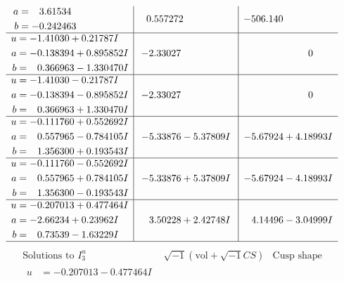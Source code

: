 \documentclass[1p]{elsarticle_modified}
\theoremstyle{definition}
\newcommand{\I}{\sqrt{-1}}
\begin{document}
$$\begin{array}{c|c|c}
\begin{aligned}
a &= \phantom{-}3.61534\phantom{ +0.000000I} \\
b &= -0.242463\phantom{ +0.000000I}\end{aligned}
 & \phantom{-}0.557272\phantom{ +0.000000I} & -506.140\phantom{ +0.000000I} \\ \hline\begin{aligned}
u &= -1.41030 + 0.21787 I \\
a &= -0.138394 + 0.895852 I \\
b &= \phantom{-}0.366963 - 1.330470 I\end{aligned}
 & -2.33027\phantom{ +0.000000I} & \phantom{-0.000000 } 0 \\ \hline\begin{aligned}
u &= -1.41030 - 0.21787 I \\
a &= -0.138394 - 0.895852 I \\
b &= \phantom{-}0.366963 + 1.330470 I\end{aligned}
 & -2.33027\phantom{ +0.000000I} & \phantom{-0.000000 } 0 \\ \hline\begin{aligned}
u &= -0.111760 + 0.552692 I \\
a &= \phantom{-}0.557965 - 0.784105 I \\
b &= \phantom{-}1.356300 + 0.193543 I\end{aligned}
 & -5.33876 - 5.37809 I & -5.67924 + 4.18993 I \\ \hline\begin{aligned}
u &= -0.111760 - 0.552692 I \\
a &= \phantom{-}0.557965 + 0.784105 I \\
b &= \phantom{-}1.356300 - 0.193543 I\end{aligned}
 & -5.33876 + 5.37809 I & -5.67924 - 4.18993 I \\ \hline\begin{aligned}
u &= -0.207013 + 0.477464 I \\
a &= -2.66234 + 0.23962 I \\
b &= \phantom{-}0.73539 - 1.63229 I\end{aligned}
 & \phantom{-}3.50228 + 2.42748 I & \phantom{-}4.14496 - 3.04999 I\\
 \hline 
 \end{array}$$\newpage$$\begin{array}{c|c|c}  
\text{Solutions to }I^u_{3}& \I (\text{vol} + \sqrt{-1}CS) & \text{Cusp shape}\\
 \hline 
\begin{aligned}
u &= -0.207013 - 0.477464 I \\

\end{aligned}
\end{array}$$
\end{document}
